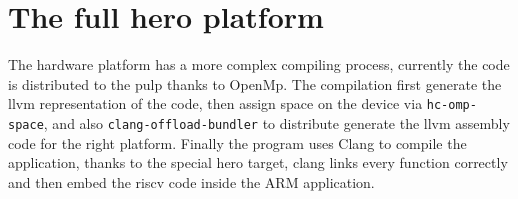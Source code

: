 		
\section{The full hero platform}
	The hardware platform has a more complex compiling process, currently the code is distributed to the \gls{pulp} thanks to OpenMp. The compilation first generate the llvm representation of the  code, then assign space on the device via \verb|hc-omp-space|, and also \verb|clang-offload-bundler| to distribute generate the llvm assembly code for the right platform. Finally the  program uses Clang to compile the application, thanks to the special hero target, clang links every function correctly and then embed the \gls{riscv} code inside the ARM application.

